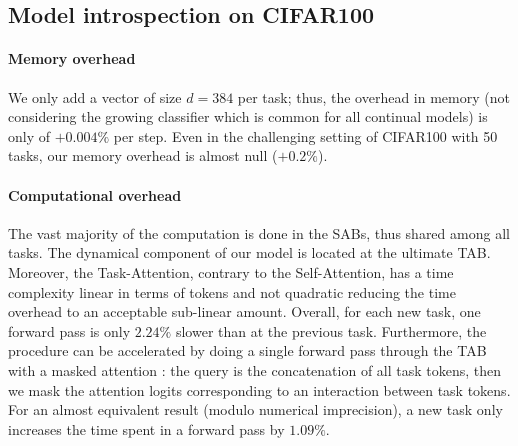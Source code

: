 \subsection{Model introspection on CIFAR100}

\paragraph{Memory overhead}
We only add a vector of size $d=384$ per task; thus, the overhead in memory (not considering the
growing classifier which is common for all continual models) is only of $+0.004\%$ per step. Even in
the challenging setting of CIFAR100 with 50 tasks, our memory overhead is almost null ($+0.2\%$).

\label{sec:dytox_comp_over}
\paragraph{Computational overhead} The vast majority of the computation is done in the SABs, thus
shared among all tasks. The dynamical component of our model is located at the ultimate TAB.
Moreover, the Task-Attention, contrary to the Self-Attention, has a time complexity linear in terms
of tokens and not quadratic reducing the time overhead to an acceptable sub-linear amount. Overall,
for each new task, one forward pass is only $2.24\%$ slower than at the previous task.
Furthermore, the procedure can be accelerated by doing a single forward pass through the TAB with
a masked attention \citep{vaswani2017transformer}: the query is the concatenation of all task
tokens, then we mask the attention logits corresponding to an interaction between task tokens. For
an almost equivalent result (modulo numerical imprecision), a new task only increases the time spent
in a forward pass by $1.09\%$.



